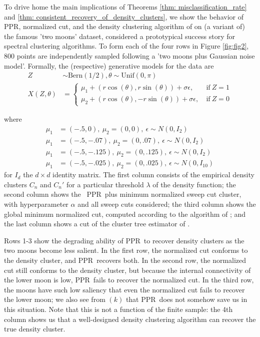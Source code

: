 \documentclass{article}
\newcommand{\1}{\mathbf{1}}
\newcommand{\ppr}{{\sc PPR}}
\newcommand{\pprspace}{{\sc PPR~}}
\theoremstyle{aldenthm}
\theoremstyle{aldenrmrk}
\begin{document}
To drive home the main implications of Theorems \ref{thm: misclassification_rate} and \ref{thm: consistent_recovery_of_density_clusters}, we show the behavior of \ppr, normalized cut, and the density clustering algorithm of \citep{chaudhuri2010} on (a variant of) the famous 'two moons' dataset, considered a prototypical success story for spectral clustering algorithms. To form each of the four rows in Figure \ref{fig:fig2}, 800 points are independently sampled following a 'two moons plus Gaussian noise model'. Formally, the (respective) generative models for the data are
\begin{align}
Z & \sim \textrm{Bern}(1/2), \theta \sim \textrm{Unif}(0, \pi) \\
X(Z,\theta) & = 
\begin{cases}
\mu_1 + (r \cos(\theta), r \sin(\theta)) + \sigma \epsilon,~ & \text{if}~ Z = 1 \\
\mu_2 + (r \cos(\theta), - r \sin(\theta)) + \sigma \epsilon,~ & \text{if}~ Z = 0
\end{cases}
\end{align}

where 
\begin{align*}
\mu_1 & = (-.5, 0),~ \mu_2 = (0,0),~ \epsilon \sim N(0, I_2) \tag{row 1} \\
\mu_1 & = (-.5, -.07),~ \mu_2 = (0,.07),~ \epsilon \sim N(0, I_2) \tag{row 2} \\
\mu_1 & = (-.5, -.125),~ \mu_2 = (0,.125),~ \epsilon \sim N(0, I_2) \tag{row 3} \\
\mu_1 & = (-.5, -.025),~ \mu_2 = (0,.025),~ \epsilon \sim N(0, I_{10}) \tag{row 4}
\end{align*}
for $I_d$ the $d \times d$ identity matrix. The first column consists of the empirical density clusters $C_n$ and $C_n'$ for a particular threshold $\lambda$ of the density function; the second column shows the ~\pprspace plus minimum normalized sweep cut cluster, with hyperparameter $\alpha$ and all sweep cuts considered; the third column shows the global minimum normalized cut, computed according to the algorithm of \cite{szlam2010}; and the last column shows a cut of the cluster tree estimator of \cite{chaudhuri2010}.

Rows 1-3 show the degrading ability of \pprspace to recover density clusters as the two moons become less salient. In the first row, the normalized cut conforms to the density cluster, and \pprspace recovers both. In the second row, the normalized cut still conforms to the density cluster, but because the internal connectivity of the lower moon is low, \pprspace fails to recover the normalized cut. In the third row, the moons have such low saliency that even the normalized cut fails to recover the lower moon; we also see from $(k)$ that \pprspace does not somehow save us in this situation. Note that this is not a function of the finite sample: the 4th column shows us that a well-designed density clustering algorithm can recover the true density cluster.
\end{document}
